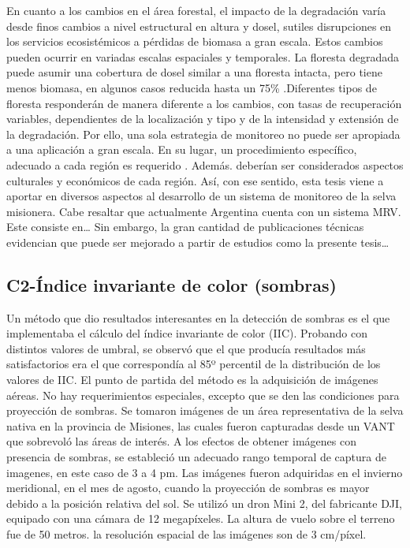 En cuanto a los cambios en el área forestal, el impacto de la degradación varía desde finos cambios a nivel estructural en altura y dosel, sutiles disrupciones en los servicios ecosistémicos a pérdidas de biomasa a gran escala. Estos cambios pueden ocurrir en variadas escalas espaciales y temporales. La floresta degradada puede asumir una cobertura de dosel similar a una floresta intacta, pero tiene menos biomasa, en algunos casos reducida hasta un 75\% \cite{change_report_2006}.Diferentes tipos de floresta responderán de manera diferente a los cambios, con tasas de recuperación variables, dependientes de la localización y tipo y de la intensidad y extensión de la degradación. Por ello, una sola estrategia de monitoreo no puede ser apropiada a una aplicación a gran escala. En su lugar, un procedimiento específico, adecuado a cada región es requerido \cite{mitchell_current_2017}. Además. deberían ser considerados aspectos culturales y económicos de cada región. Así, con ese sentido, esta tesis viene a aportar en diversos aspectos al desarrollo de un sistema de monitoreo de la selva misionera.
Cabe resaltar que actualmente Argentina cuenta con un sistema MRV. Este consiste en…
Sin embargo, la gran cantidad de publicaciones técnicas evidencian que puede ser mejorado a partir de estudios como la presente tesis…

\subsection{C2-Índice invariante de color (sombras)}
Un método que dio resultados interesantes en la detección de sombras es el que implementaba el cálculo del índice invariante de color (IIC). Probando con distintos valores de umbral, se observó que el que producía resultados más satisfactorios era el que correspondía al 85º percentil de la distribución de los valores de IIC.
El punto de partida del método es la adquisición de imágenes aéreas. No hay requerimientos especiales, excepto que se den las condiciones para proyección de sombras. Se tomaron imágenes de un área representativa de la selva nativa en la provincia de Misiones, las cuales fueron capturadas desde un VANT que sobrevoló las áreas de interés. A los efectos de obtener imágenes con presencia de sombras, se estableció un adecuado rango temporal de captura de imagenes, en este caso de 3 a 4 pm. Las imágenes fueron adquiridas en el invierno meridional, en el mes de agosto, cuando la proyección de sombras es mayor debido a la posición relativa del sol. Se utilizó un dron Mini 2, del fabricante DJI, equipado con una cámara de 12 megapíxeles. La altura de vuelo sobre el terreno fue de 50 metros. la resolución espacial de las imágenes son de 3 cm/píxel.
